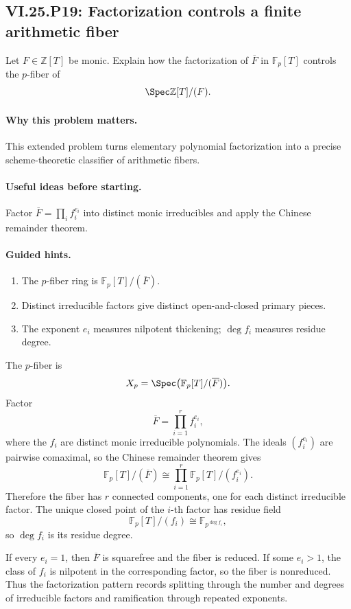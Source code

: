 \subsection*{VI.25.P19: Factorization controls a finite arithmetic fiber}
\begin{problem}\label{prob:vi25-p19}
Let \(F\in\mathbb Z[T]\) be monic. Explain how the factorization of \(\overline F\) in \(\mathbb F_p[T]\) controls the \(p\)-fiber of
\[
\Spec\mathbb Z[T]/(F).
\]
\end{problem}

\ifdefined\FullProblemDossiers
\paragraph{Why this problem matters.}
This extended problem turns elementary polynomial factorization into a precise scheme-theoretic classifier of arithmetic fibers.

\paragraph{Useful ideas before starting.}
Factor \(\overline F=\prod_i f_i^{e_i}\) into distinct monic irreducibles and apply the Chinese remainder theorem.

\paragraph{Guided hints.}
\begin{enumerate}
\item The \(p\)-fiber ring is \(\mathbb F_p[T]/(\overline F)\).
\item Distinct irreducible factors give distinct open-and-closed primary pieces.
\item The exponent \(e_i\) measures nilpotent thickening; \(\deg f_i\) measures residue degree.
\end{enumerate}

\begin{solution}
The \(p\)-fiber is
\[
X_p
=
\Spec\bigl(\mathbb F_p[T]/(\overline F)\bigr).
\]
Factor
\[
\overline F=\prod_{i=1}^r f_i^{e_i},
\]
where the \(f_i\) are distinct monic irreducible polynomials.  The ideals \((f_i^{e_i})\) are pairwise comaximal, so the Chinese remainder theorem gives
\[
\mathbb F_p[T]/(\overline F)
\cong
\prod_{i=1}^r
\mathbb F_p[T]/(f_i^{e_i}).
\]
Therefore the fiber has \(r\) connected components, one for each distinct irreducible factor.  The unique closed point of the \(i\)-th factor has residue field
\[
\mathbb F_p[T]/(f_i)\cong\mathbb F_{p^{\deg f_i}},
\]
so \(\deg f_i\) is its residue degree.

If every \(e_i=1\), then \(\overline F\) is squarefree and the fiber is reduced.  If some \(e_i>1\), the class of \(f_i\) is nilpotent in the corresponding factor, so the fiber is nonreduced.  Thus the factorization pattern records splitting through the number and degrees of irreducible factors and ramification through repeated exponents.
\end{solution}

